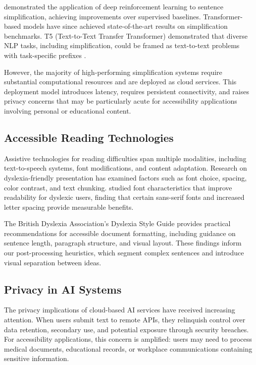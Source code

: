 \documentclass[11pt]{article}
\begin{document}
\citet{zhang2017} demonstrated the application of deep reinforcement learning to sentence simplification, achieving improvements over supervised baselines. Transformer-based models have since achieved state-of-the-art results on simplification benchmarks. T5 (Text-to-Text Transfer Transformer) demonstrated that diverse NLP tasks, including simplification, could be framed as text-to-text problems with task-specific prefixes \citep{raffel2020}.

However, the majority of high-performing simplification systems require substantial computational resources and are deployed as cloud services. This deployment model introduces latency, requires persistent connectivity, and raises privacy concerns that may be particularly acute for accessibility applications involving personal or educational content.

\subsection{Accessible Reading Technologies}

Assistive technologies for reading difficulties span multiple modalities, including text-to-speech systems, font modifications, and content adaptation. Research on dyslexia-friendly presentation has examined factors such as font choice, spacing, color contrast, and text chunking. \citet{rello2013} studied font characteristics that improve readability for dyslexic users, finding that certain sans-serif fonts and increased letter spacing provide measurable benefits.

The British Dyslexia Association's Dyslexia Style Guide \citep{bda2023} provides practical recommendations for accessible document formatting, including guidance on sentence length, paragraph structure, and visual layout. These findings inform our post-processing heuristics, which segment complex sentences and introduce visual separation between ideas.

\subsection{Privacy in AI Systems}

The privacy implications of cloud-based AI services have received increasing attention. When users submit text to remote APIs, they relinquish control over data retention, secondary use, and potential exposure through security breaches. For accessibility applications, this concern is amplified: users may need to process medical documents, educational records, or workplace communications containing sensitive information.
\end{document}

